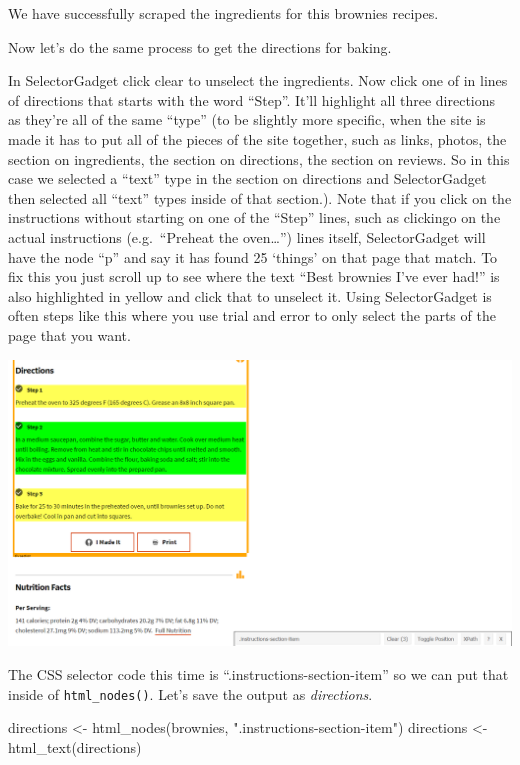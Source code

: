\documentclass[
  12pt,
  openany]{book}
\newenvironment{Shaded}{\begin{snugshade}}{\end{snugshade}}
\newcommand{\FunctionTok}[1]{\textcolor[rgb]{0,0,0}{#1}}
\newcommand{\NormalTok}[1]{#1}
\newcommand{\OtherTok}[1]{\textcolor[rgb]{0.37,0.37,0.37}{#1}}
\newcommand{\StringTok}[1]{\textcolor[rgb]{0.5,0.5,0.5}{#1}}
\begin{document}
We have successfully scraped the ingredients for this brownies recipes.

Now let's do the same process to get the directions for baking.

In SelectorGadget click clear to unselect the ingredients. Now click one of in lines of directions that starts with the word ``Step''. It'll highlight all three directions as they're all of the same ``type'' (to be slightly more specific, when the site is made it has to put all of the pieces of the site together, such as links, photos, the section on ingredients, the section on directions, the section on reviews. So in this case we selected a ``text'' type in the section on directions and SelectorGadget then selected all ``text'' types inside of that section.). Note that if you click on the instructions without starting on one of the ``Step'' lines, such as clickingo on the actual instructions (e.g.~``Preheat the oven\ldots{}'') lines itself, SelectorGadget will have the node ``p'' and say it has found 25 `things' on that page that match. To fix this you just scroll up to see where the text ``Best brownies I've ever had!'' is also highlighted in yellow and click that to unselect it. Using SelectorGadget is often steps like this where you use trial and error to only select the parts of the page that you want.

\includegraphics{images/brownies_5.PNG}

The CSS selector code this time is ``.instructions-section-item'' so we can put that inside of \texttt{html\_nodes()}. Let's save the output as \emph{directions}.

\begin{Shaded}
\begin{Highlighting}[]
\NormalTok{directions }\OtherTok{\textless{}{-}} \FunctionTok{html\_nodes}\NormalTok{(brownies, }\StringTok{".instructions{-}section{-}item"}\NormalTok{)}
\NormalTok{directions }\OtherTok{\textless{}{-}} \FunctionTok{html\_text}\NormalTok{(directions)}
\end{Highlighting}
\end{Shaded}
\end{document}
